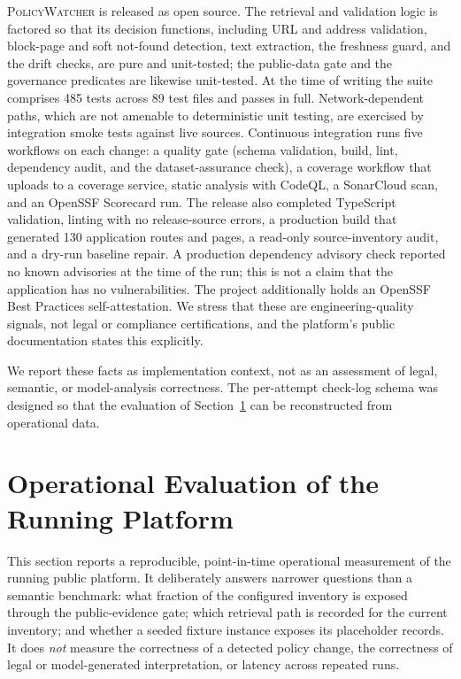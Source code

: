 \documentclass[11pt]{article}
\newcommand{\pw}{\textsc{PolicyWatcher}}
\begin{document}
\pw{} is released as open source. The retrieval and validation logic is factored
so that its decision functions, including URL and address validation, block-page
and soft not-found detection, text extraction, the freshness guard, and the
drift checks, are pure and unit-tested; the public-data gate and the governance
predicates are likewise unit-tested. At the time of writing the suite comprises
485 tests across 89 test files and passes in full. Network-dependent paths, which are
not amenable to deterministic unit testing, are exercised by integration smoke
tests against live sources. Continuous integration runs five workflows on each
change: a quality gate (schema validation, build, lint, dependency audit, and the
dataset-assurance check), a coverage workflow that uploads to a coverage service,
static analysis with CodeQL, a SonarCloud scan, and an OpenSSF Scorecard run.
The release also completed TypeScript validation, linting with no release-source
errors, a production build that generated 130 application routes and pages, a
read-only source-inventory audit, and a dry-run baseline repair. A production
dependency advisory check reported no known advisories at the time of the run;
this is not a claim that the application has no vulnerabilities. The project
additionally holds an OpenSSF Best Practices self-attestation. We stress
that these are engineering-quality signals, not legal or compliance
certifications, and the platform's public documentation states this explicitly.

We report these facts as implementation context, not as an assessment of legal,
semantic, or model-analysis correctness. The per-attempt check-log schema was
designed so that the evaluation of Section~\ref{sec:eval} can be reconstructed
from operational data.

\section{Operational Evaluation of the Running Platform}
\label{sec:eval}

This section reports a reproducible, point-in-time operational measurement of
the running public platform. It deliberately answers narrower questions than a
semantic benchmark: what fraction of the configured inventory is exposed through
the public-evidence gate; which retrieval path is recorded for the current
inventory; and whether a seeded fixture instance exposes its placeholder records.
It does \emph{not} measure the correctness of a detected policy change, the
correctness of legal or model-generated interpretation, or latency across repeated
runs.
\end{document}
